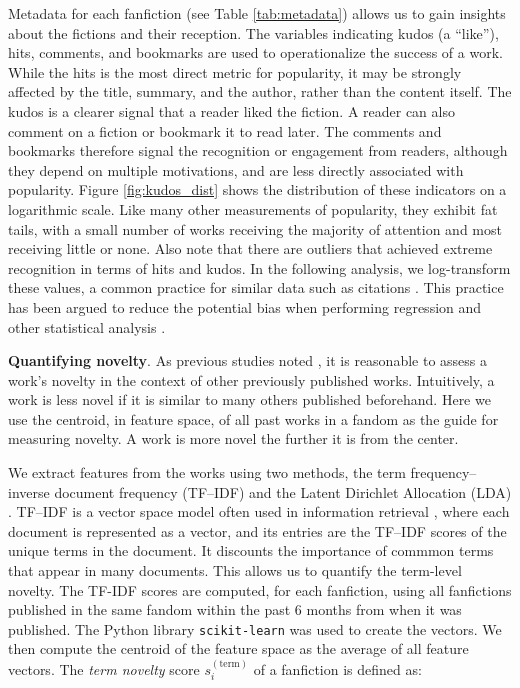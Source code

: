 \documentclass[letterpaper]{article} %
\begin{document}
Metadata for each fanfiction (see Table \ref{tab:metadata}) allows us to gain insights about the fictions and their reception. The variables indicating kudos (a ``like''), hits, comments, and bookmarks are used to operationalize the success of a work. While the hits is the most direct metric for popularity, it may be strongly affected by the title, summary, and the author, rather than the content itself. The kudos is a clearer signal that a reader liked the fiction. A reader can also comment on a fiction or bookmark it to read later. The comments and bookmarks therefore signal the recognition or engagement from readers, although they depend on multiple motivations, and are less directly associated with popularity. Figure \ref{fig:kudos_dist} shows the distribution of these indicators on a logarithmic scale. Like many other measurements of popularity, they exhibit fat tails, with a small number of works receiving the majority of attention and most receiving little or none. Also note that there are outliers that achieved extreme recognition in terms of hits and kudos. In the following analysis, we log-transform these values, a common practice for similar data such as citations \cite{thelwall2014regression}. This practice has been argued to reduce the potential bias when performing regression and other statistical analysis \cite{thelwall2014regression}. 

\textbf{Quantifying novelty}. As previous studies noted \cite{askin2017makes,de2015game}, it is reasonable to assess a work's novelty in the context of other previously published works. Intuitively, a work is less novel if it is similar to many others published beforehand. Here we use the centroid, in feature space, of all past works in a fandom as the guide for measuring novelty. A work is more novel the further it is from the center. 

We extract features from the works using two methods, the term frequency--inverse document frequency (TF--IDF) and the Latent Dirichlet Allocation (LDA) \cite{blei2003latent}. TF--IDF is a vector space model often used in information retrieval \cite{salton1988term}, where each document is represented as a vector, and its entries are the TF--IDF scores of the unique terms in the document. It discounts the importance of commmon terms that appear in many documents. This allows us to quantify the term-level novelty. The TF-IDF scores are computed, for each fanfiction, using all fanfictions published in the same fandom within the past 6 months from when it was published. The Python library \texttt{scikit-learn} was used to create the vectors. We then compute the centroid of the feature space as the average of all feature vectors. The \emph{term novelty} score $s_{i}^{(\mathrm{term})}$ of a fanfiction is defined as:
\end{document}
